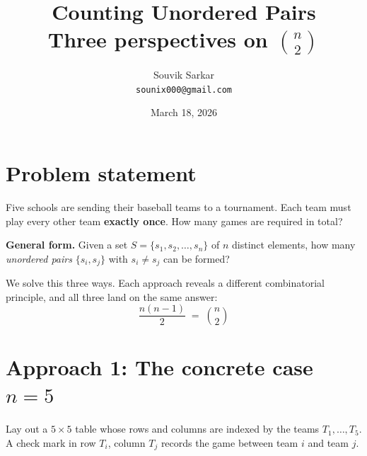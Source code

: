 \documentclass[11pt]{article}
\title{\bfseries Counting Unordered Pairs\\[4pt]
\large Three perspectives on $\binom{n}{2}$}
\author{Souvik Sarkar \\ \texttt{sounix000@gmail.com}}
\date{March 18, 2026}
\begin{document}
\maketitle

\section*{Problem statement}

\begin{tcolorbox}[mybox, title=Motivating problem]
Five schools are sending their baseball teams to a tournament. Each team must play every other team \textbf{exactly once}. How many games are required in total?

\medskip
\noindent\textbf{General form.} Given a set $S=\{s_1, s_2, \dots, s_n\}$ of $n$ distinct elements, how many \emph{unordered pairs} $\{s_i, s_j\}$ with $s_i \neq s_j$ can be formed?
\end{tcolorbox}

We solve this three ways. Each approach reveals a different combinatorial principle, and all three land on the same answer:
\[
  \boxed{\;\dfrac{n(n-1)}{2}\;=\;\binom{n}{2}\;}
\]

\section*{Approach 1: The concrete case $n=5$}

Lay out a $5 \times 5$ table whose rows and columns are indexed by the teams $T_1, \dots, T_5$. A check mark in row $T_i$, column $T_j$ records the game between team $i$ and team $j$.

\begin{center}
\end{center}
\end{document}
